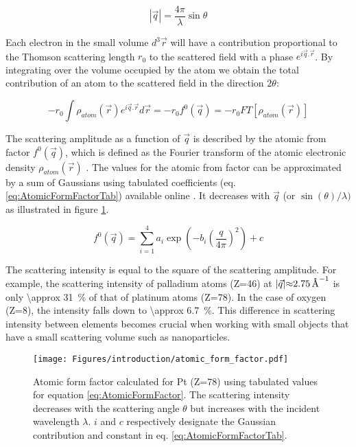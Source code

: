 \begin{equation}
    \label{eq:QSinTheta}
    |\vec{q}| = \frac{4\pi}{\lambda} \sin{\theta}
\end{equation}

Each electron in the small volume $d^3\vec{r}$ will have a contribution proportional to the Thomson scattering length $r_0$ to the scattered field with a phase $e^{i\vec{q}.\vec{r}}$.
By integrating over the volume occupied by the atom we obtain the total contribution of an atom to the scattered field in the direction $2\theta$:

\begin{equation}
    \label{eq:AtomicFormFactor}
    -r_0 \int \rho_{atom} (\vec{r}) e^{i\vec{q}.\vec{r}} d\vec{r} = -r_0 f^0(\vec{q}) = -r_0 FT [\rho_{atom} (\vec{r})]
\end{equation}

The scattering amplitude as a function of $\vec{q}$ is described by the atomic from factor $f^0(\vec{q})$, which is defined as the Fourier transform of the atomic electronic density $\rho_{atom}(\vec{r})$ \parencite{Paganin}.
The values for the atomic from factor can be approximated by a sum of Gaussians using tabulated coefficients (eq. \ref{eq:AtomicFormFactorTab}) available online \parencite{InterTablesOfCryst}.
It decreases with $\vec{q}$ (or $\sin(\theta) / \lambda)$ as illustrated in figure \ref{fig:atomic_form_factor}.

\begin{equation}
    \label{eq:AtomicFormFactorTab}
    f^0(\vec{q}) = \sum_{i=1}^4 a_i \exp (-b_i (\frac{q} {4\pi})^2) + c
\end{equation}

The scattering intensity is equal to the square of the scattering amplitude.
For example, the scattering intensity of palladium atoms (Z=46) at $|\vec{q}| \qty{\approx 2.75}{\angstrom^{-1}}$ is only \qty{\approx 31}{\percent} of that of platinum atoms (Z=78).
In the case of oxygen (Z=8), the intensity falls down to \qty{\approx 6.7}{\percent}.
This difference in scattering intensity between elements becomes crucial when working with small objects that have a small scattering volume such as nanoparticles.

\begin{figure}[!htb]
    \centering
    \texttt{[image: Figures/introduction/atomic\_form\_factor.pdf]}
    \caption{
    Atomic form factor calculated for Pt (Z=78) using tabulated values \parencite{InterTablesOfCryst} for equation \ref{eq:AtomicFormFactor}. The scattering intensity decreases with the scattering angle $\theta$ but increases with the incident wavelength $\lambda$. $i$ and $c$ respectively designate the Gaussian contribution and constant in eq. \ref{eq:AtomicFormFactorTab}.
    }
    \label{fig:atomic_form_factor}
\end{figure}

